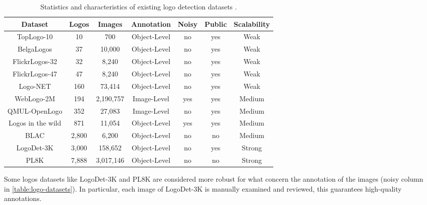 \begin{table}
    \begin{center}
        \begin{tabular}{c || c | c | c | c | c |c} 
            \hline
            \textbf{Dataset} & \textbf{Logos} & \textbf{Images} & \textbf{Annotation} & \textbf{Noisy} & \textbf{Public} & \textbf{Scalability} \\
            \hline
            \hline
            TopLogo-10 \cite{su2017deep} & 10 & 700 & Object-Level & no & yes & Weak \\ 
       \hline
           BelgaLogos \cite{joly2009logo} & 37 & 10,000 & Object-Level & no & yes & Weak \\ 
       \hline
           FlickrLogos-32 \cite{romberg2011scalable} & 32 & 8,240 & Object-Level & no & yes & Weak \\ 
       \hline
           FlickrLogos-47 \cite{romberg2011scalable} & 47 & 8,240 & Object-Level & no & yes & Weak \\ 
       \hline
           Logo-NET \cite{hoi2015logo} & 160 & 73,414 & Object-Level & no & yes & Weak \\ 
       \hline
           WebLogo-2M \cite{su2017weblogo} & 194 & 2,190,757 & Image-Level & yes & yes & Medium \\ 
       \hline
           QMUL-OpenLogo \cite{su2018open} & 352 & 27,083 & Image-Level & no & yes & Medium \\ 
       \hline
           Logos in the wild \cite{tuzko2017open} & 871 & 11,054 & Object-Level & yes & yes & Medium \\ 
       \hline
           BLAC \cite{bastan2019large} & 2,800 & 6,200 & Object-Level & no & no & Medium \\ 
       \hline
           LogoDet-3K \cite{wang2022logodet} & 3,000 & 158,652 & Object-Level & no & yes & Strong \\ 
       \hline
           PL8K \cite{li2022seetek} & 7,888 & 3,017,146 & Object-Level & no & no & Strong \\ 
           \hline
       
           \end{tabular}
    \end{center}
    
    \caption{Statistics and characteristics of existing logo detection datasets \cite{li2022seetek}.}
    \label{table:logo-datasets}
\end{table}

Some logos datasets like LogoDet-3K and PL8K are considered more robust for what concern the annotation of the images (noisy column in \autoref{table:logo-datasets}). In particular, each image of LogoDet-3K is manually examined and
reviewed, this guarantees high-quality annotations.

